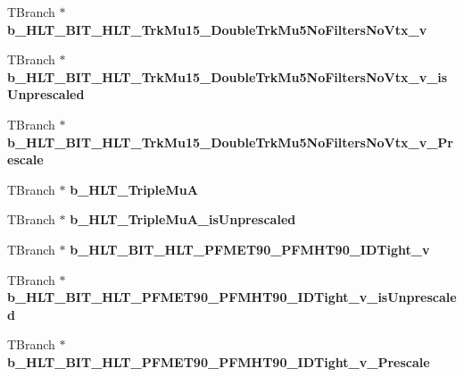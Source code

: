 \begin{DoxyCompactItemize}
\item 
\hypertarget{classMiniTree_aec3348bd8ddc4831c1e49d09a296b6d1}{}\label{classMiniTree_aec3348bd8ddc4831c1e49d09a296b6d1} 
T\+Branch $\ast$ {\bfseries b\+\_\+\+H\+L\+T\+\_\+\+B\+I\+T\+\_\+\+H\+L\+T\+\_\+\+Trk\+Mu15\+\_\+\+Double\+Trk\+Mu5\+No\+Filters\+No\+Vtx\+\_\+v}
\item 
\hypertarget{classMiniTree_a211ced7ea7387fe8dd190a004ed182b1}{}\label{classMiniTree_a211ced7ea7387fe8dd190a004ed182b1} 
T\+Branch $\ast$ {\bfseries b\+\_\+\+H\+L\+T\+\_\+\+B\+I\+T\+\_\+\+H\+L\+T\+\_\+\+Trk\+Mu15\+\_\+\+Double\+Trk\+Mu5\+No\+Filters\+No\+Vtx\+\_\+v\+\_\+is\+Unprescaled}
\item 
\hypertarget{classMiniTree_a080043b487f0df29d6ee317f1f108df6}{}\label{classMiniTree_a080043b487f0df29d6ee317f1f108df6} 
T\+Branch $\ast$ {\bfseries b\+\_\+\+H\+L\+T\+\_\+\+B\+I\+T\+\_\+\+H\+L\+T\+\_\+\+Trk\+Mu15\+\_\+\+Double\+Trk\+Mu5\+No\+Filters\+No\+Vtx\+\_\+v\+\_\+\+Prescale}
\item 
\hypertarget{classMiniTree_aa2eade73ad0f329174d6e86e1fb62f7e}{}\label{classMiniTree_aa2eade73ad0f329174d6e86e1fb62f7e} 
T\+Branch $\ast$ {\bfseries b\+\_\+\+H\+L\+T\+\_\+\+Triple\+MuA}
\item 
\hypertarget{classMiniTree_ac33588ffc310d9c368ba97ced6bf69e7}{}\label{classMiniTree_ac33588ffc310d9c368ba97ced6bf69e7} 
T\+Branch $\ast$ {\bfseries b\+\_\+\+H\+L\+T\+\_\+\+Triple\+Mu\+A\+\_\+is\+Unprescaled}
\item 
\hypertarget{classMiniTree_a303a8a491b2e3b68c31f4c8b7e889d8b}{}\label{classMiniTree_a303a8a491b2e3b68c31f4c8b7e889d8b} 
T\+Branch $\ast$ {\bfseries b\+\_\+\+H\+L\+T\+\_\+\+B\+I\+T\+\_\+\+H\+L\+T\+\_\+\+P\+F\+M\+E\+T90\+\_\+\+P\+F\+M\+H\+T90\+\_\+\+I\+D\+Tight\+\_\+v}
\item 
\hypertarget{classMiniTree_af2417eaa7a672cc646f329e3214cefef}{}\label{classMiniTree_af2417eaa7a672cc646f329e3214cefef} 
T\+Branch $\ast$ {\bfseries b\+\_\+\+H\+L\+T\+\_\+\+B\+I\+T\+\_\+\+H\+L\+T\+\_\+\+P\+F\+M\+E\+T90\+\_\+\+P\+F\+M\+H\+T90\+\_\+\+I\+D\+Tight\+\_\+v\+\_\+is\+Unprescaled}
\item 
\hypertarget{classMiniTree_ab28ce05443efdd16edc7ef45a338b1c1}{}\label{classMiniTree_ab28ce05443efdd16edc7ef45a338b1c1} 
T\+Branch $\ast$ {\bfseries b\+\_\+\+H\+L\+T\+\_\+\+B\+I\+T\+\_\+\+H\+L\+T\+\_\+\+P\+F\+M\+E\+T90\+\_\+\+P\+F\+M\+H\+T90\+\_\+\+I\+D\+Tight\+\_\+v\+\_\+\+Prescale}
\item 
\hypertarget{classMiniTree_a120afdff467783b9da2ab97b70d5fdc1}{}\label{classMiniTree_a120afdff467783b9da2ab97b70d5fdc1} 

\end{DoxyCompactItemize}
